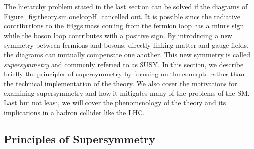 The hierarchy problem stated in the last section can be solved if the 
diagrams of Figure~\ref{fig:theory.sm.oneloopH} cancelled out. 
It is possible since the radiative contributions to the Higgs mass 
coming from the fermion loop has a minus sign while 
the boson loop contributes with a positive sign. 
By introducing a new symmetry between 
fermions and bosons, directly linking matter and gauge fields, 
the diagrams can mutually compensate one another.
This new symmetry is called \textit{supersymmetry} and commonly referred to as SUSY.
In this section, we describe briefly the principles of supersymmetry by focusing 
on the concepts rather than the technical implementation of the theory.
We also cover the motivations for examining supersymmetry and how it mitigates
many of the problems of the SM. Last but not least,
we will cover the phenomenology of the theory and its implications in a hadron 
collider like the LHC.

\subsection{Principles of Supersymmetry}


